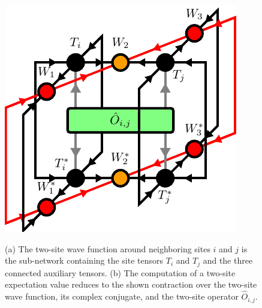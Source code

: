 \begin{figure}
	\centering
	\subcaptionbox{\label{fig:YB_isoTPS_twosite_expectation_value_environment}}
	{%
		\usebox{\largestimage}
	}
	\quad\quad
	\subcaptionbox{\label{fig:YB_isoTPS_twosite_expectation_value_computation}}
	{%
		\raisebox{\dimexpr.5\ht\largestimage-.5\height}
		{%
			\includegraphics[scale=1.0]{figures/tikz/YB_isoTPS/two_site_expectation_value/two_site_expectation_value_b.pdf}
		}
	}
	\caption{(a) The two-site wave function around neighboring sites $i$ and $j$ is the sub-network containing the site tensors $T_i$ and $T_j$ and the three connected auxiliary tensors. (b) The computation of a two-site expectation value reduces to the shown contraction over the two-site wave function, its complex conjugate, and the two-site operator $\hat{O}_{i,j}$.}
	\label{fig:YB_isoTPS_twosite_expectation_value}
\end{figure}
